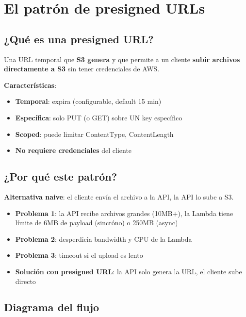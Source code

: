 \documentclass[11pt,a4paper,oneside]{article}
\newcommand{\ok}{\textcolor{okgreen}{\textbf{\checkmark}}}
\newcommand{\err}{\textcolor{errred}{\textbf{\ding{55}}}}
\begin{document}
\tableofcontents
\newpage

\section{El patr\'on de presigned URLs}

\subsection{¿Qu\'e es una presigned URL?}

Una URL temporal que \textbf{S3 genera} y que permite a un cliente \textbf{subir archivos directamente a S3} sin tener credenciales de AWS.

\textbf{Caracter\'isticas}:
\begin{itemize}
  \item \ok \textbf{Temporal}: expira (configurable, default 15 min)
  \item \ok \textbf{Espec\'ifica}: solo PUT (o GET) sobre UN key espec\'ifico
  \item \ok \textbf{Scoped}: puede limitar ContentType, ContentLength
  \item \ok \textbf{No requiere credenciales} del cliente
\end{itemize}

\subsection{¿Por qu\'e este patr\'on?}

\textbf{Alternativa naive}: el cliente env\'ia el archivo a la API, la API lo sube a S3.

\begin{itemize}
  \item \err \textbf{Problema 1}: la API recibe archivos grandes (10MB+), la Lambda tiene l\'imite de 6MB de payload (sincr\'ono) o 250MB (async)
  \item \err \textbf{Problema 2}: desperdicia bandwidth y CPU de la Lambda
  \item \err \textbf{Problema 3}: timeout si el upload es lento
  \item \ok \textbf{Soluci\'on con presigned URL}: la API solo genera la URL, el cliente sube directo
\end{itemize}

\subsection{Diagrama del flujo}
\end{document}
